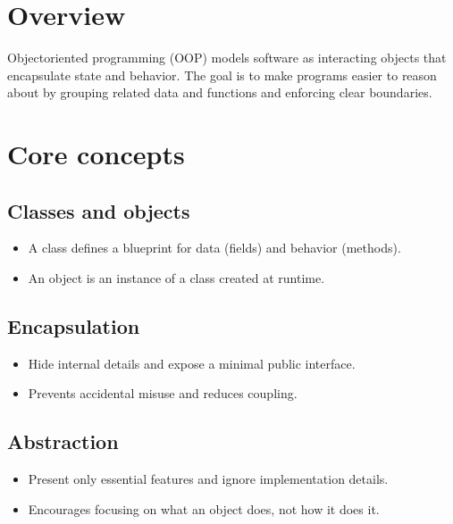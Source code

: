 \documentclass[letterpaper,10pt,english]{sphinxmanual}
\begin{document}
\section{Overview}
\label{\detokenize{appendix_a_object_oriented_programming:overview}}
\sphinxAtStartPar
Object\sphinxhyphen{}oriented programming (OOP) models software as interacting objects that
encapsulate state and behavior. The goal is to make programs easier to reason
about by grouping related data and functions and enforcing clear boundaries.


\section{Core concepts}
\label{\detokenize{appendix_a_object_oriented_programming:core-concepts}}

\subsection{Classes and objects}
\label{\detokenize{appendix_a_object_oriented_programming:classes-and-objects}}\begin{itemize}
\item {} 
\sphinxAtStartPar
A class defines a blueprint for data (fields) and behavior (methods).

\item {} 
\sphinxAtStartPar
An object is an instance of a class created at runtime.

\end{itemize}


\subsection{Encapsulation}
\label{\detokenize{appendix_a_object_oriented_programming:encapsulation}}\begin{itemize}
\item {} 
\sphinxAtStartPar
Hide internal details and expose a minimal public interface.

\item {} 
\sphinxAtStartPar
Prevents accidental misuse and reduces coupling.

\end{itemize}


\subsection{Abstraction}
\label{\detokenize{appendix_a_object_oriented_programming:abstraction}}\begin{itemize}
\item {} 
\sphinxAtStartPar
Present only essential features and ignore implementation details.

\item {} 
\sphinxAtStartPar
Encourages focusing on what an object does, not how it does it.

\end{itemize}
\end{document}
